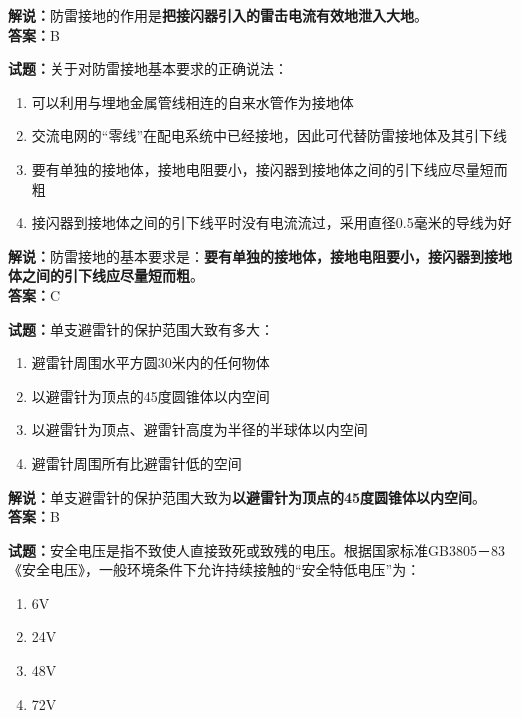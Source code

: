 \documentclass{ctexbook}
\begin{document}
\noindent\textbf{解说：}防雷接地的作用是\textbf{把接闪器引入的雷击电流有效地泄入大地}。\\\noindent\textbf{答案：}B


\bigskip


\noindent\textbf{试题：}关于对防雷接地基本要求的正确说法：

\begin{enumerate}[leftmargin=3em]
	\item 可以利用与埋地金属管线相连的自来水管作为接地体
	\item 交流电网的“零线”在配电系统中已经接地，因此可代替防雷接地体及其引下线
	\item 要有单独的接地体，接地电阻要小，接闪器到接地体之间的引下线应尽量短而粗
	\item 接闪器到接地体之间的引下线平时没有电流流过，采用直径0.5毫米的导线为好
\end{enumerate}

\noindent\textbf{解说：}防雷接地的基本要求是：\textbf{要有单独的接地体，接地电阻要小，接闪器到接地体之间的引下线应尽量短而粗}。\\\noindent\textbf{答案：}C%


\bigskip


\noindent\textbf{试题：}单支避雷针的保护范围大致有多大：

\begin{enumerate}[leftmargin=3em]
	\item 避雷针周围水平方圆30米内的任何物体
	\item 以避雷针为顶点的45度圆锥体以内空间
	\item 以避雷针为顶点、避雷针高度为半径的半球体以内空间
	\item 避雷针周围所有比避雷针低的空间
\end{enumerate}

\noindent\textbf{解说：}单支避雷针的保护范围大致为\textbf{以避雷针为顶点的45度圆锥体以内空间}。\\\noindent\textbf{答案：}B%


\bigskip


\noindent\textbf{试题：}安全电压是指不致使人直接致死或致残的电压。根据国家标准GB3805－83《安全电压》，一般环境条件下允许持续接触的“安全特低电压”为：

\begin{enumerate}[leftmargin=3em]
	\item 6V
	\item 24V
	\item 48V
	\item 72V
\end{enumerate}
\end{document}
